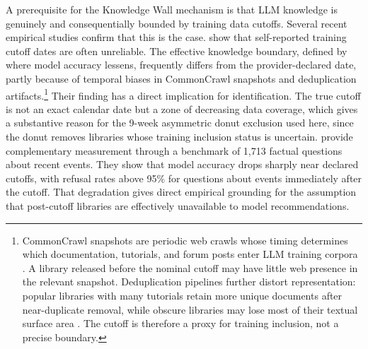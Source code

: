 \documentclass[12pt, a4paper]{report}
\begin{document}
A prerequisite for the Knowledge Wall mechanism is that LLM knowledge is genuinely and consequentially bounded by training data cutoffs. Several recent empirical studies confirm that this is the case. \citet{cheng2024dated} show that self-reported training cutoff dates are often unreliable. The effective knowledge boundary, defined by where model accuracy lessens, frequently differs from the provider-declared date, partly because of temporal biases in CommonCrawl snapshots and deduplication artifacts.\footnote{CommonCrawl snapshots are periodic web crawls whose timing determines which documentation, tutorials, and forum posts enter LLM training corpora \citep{dodge2021documenting}. A library released before the nominal cutoff may have little web presence in the relevant snapshot. Deduplication pipelines further distort representation: popular libraries with many tutorials retain more unique documents after near-duplicate removal, while obscure libraries may lose most of their textual surface area \citep{lee2022deduplication}. The cutoff is therefore a proxy for training inclusion, not a precise boundary.} Their finding has a direct implication for identification. The true cutoff is not an exact calendar date but a zone of decreasing data coverage, which gives a substantive reason for the 9-week asymmetric donut exclusion used here, since the donut removes libraries whose training inclusion status is uncertain. \citet{pezik2025llmlagbench} provide complementary measurement through a benchmark of 1,713 factual questions about recent events. They show that model accuracy drops sharply near declared cutoffs, with refusal rates above 95\% for questions about events immediately after the cutoff. That degradation gives direct empirical grounding for the assumption that post-cutoff libraries are effectively unavailable to model recommendations.
\end{document}
